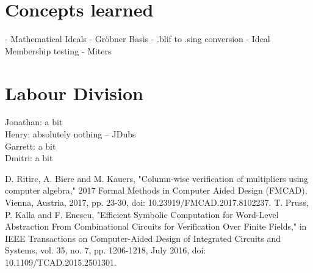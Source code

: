 \documentclass[conference]{IEEEtran}
\begin{document}
\section{Concepts learned}
- Mathematical Ideals
- Gröbner Basis
- .blif to .sing conversion
- Ideal Membership testing
- Miters

\section{Labour Division}
Jonathan: a bit \\
Henry: absolutely nothing -- JDubs \\
Garrett: a bit \\
Dmitri: a bit

\begin{thebibliography}{00}
 D. Ritirc, A. Biere and M. Kauers, "Column-wise verification of multipliers using computer algebra," 2017 Formal Methods in Computer Aided Design (FMCAD), Vienna, Austria, 2017, pp. 23-30, doi: 10.23919/FMCAD.2017.8102237.
 T. Pruss, P. Kalla and F. Enescu, "Efficient Symbolic Computation for Word-Level Abstraction From Combinational Circuits for Verification Over Finite Fields," in IEEE Transactions on Computer-Aided Design of Integrated Circuits and Systems, vol. 35, no. 7, pp. 1206-1218, July 2016, doi: 10.1109/TCAD.2015.2501301.
\end{thebibliography}
\vspace{12pt}
\end{document}
